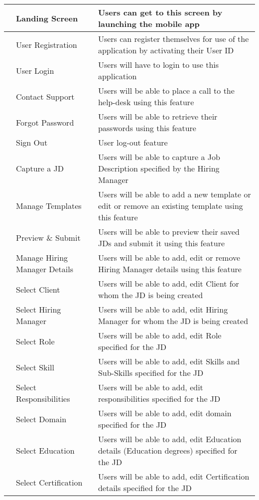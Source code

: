 \documentclass[hidelinks,a4paper]{article}
\begin{document}
\begin{center}
{\begin{tabularx}{\textwidth}{ | >{\ttfamily\raggedright\arraybackslash} s 
	  | >{\ttfamily\raggedright\arraybackslash} t 
	  | >{\ttfamily\raggedright\arraybackslash} t | }
	 & Landing Screen & Users can get to this screen by launching the mobile app  \\
	  & User Registration & Users can register themselves for use of the application by activating their User ID  \\
	 & User Login & Users will have to login to use this application  \\
	 & Contact Support & Users will be able to place a call to the help-desk using this feature  \\
	 & Forgot Password & Users will be able to retrieve their passwords using this feature  \\
	 & Sign Out & User log-out feature  \\ [1em]	
	 & Capture a JD & Users will be able to capture a Job Description specified by the Hiring Manager  \\
	 & Manage Templates & Users will be able to add a new template or edit or remove an existing template using this feature  \\
	 & Preview \& Submit & Users will be able to preview their saved JDs and submit it using this feature  \\
	 & Manage Hiring Manager Details & Users will be able to add, edit or remove Hiring Manager details using this feature  \\
	 & Select Client & Users will be able to add, edit Client for whom the JD is being created  \\
	 & Select Hiring Manager & Users will be able to add, edit Hiring Manager for whom the JD is being created  \\
	 & Select Role & Users will be able to add, edit Role specified for the JD  \\
	 & Select Skill & Users will be able to add, edit Skills and Sub-Skills specified for the JD  \\
	 & Select Responsibilities & Users will be able to add, edit responsibilities specified for the JD  \\
	 & Select Domain & Users will be able to add, edit domain specified for the JD  \\
	 & Select Education & Users will be able to add, edit Education details (Education degrees) specified for the JD  \\
	 & Select Certification & Users will be able to add, edit Certification details specified for the JD  \\

\end{tabularx}}
\end{center}
\end{document}

